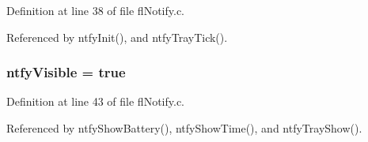Definition at line 38 of file fl\-Notify.c.

Referenced by ntfy\-Init(), and ntfy\-Tray\-Tick().
\subsubsection{ {\bf ntfy\-Visible} = true}\label{flNotify_8c_2cdc8553a78172b2afcd7d87828d90dd}




Definition at line 43 of file fl\-Notify.c.

Referenced by ntfy\-Show\-Battery(), ntfy\-Show\-Time(), and ntfy\-Tray\-Show().